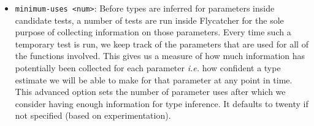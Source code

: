 \begin{itemize}
   \item \texttt{\textendash \textendash minimum-uses <num>}: Before types are inferred for parameters inside candidate tests, a number of tests are run inside \textsf{Flycatcher} for the sole purpose of collecting information on those parameters. Every time such a temporary test is run, we keep track of the parameters that are used for all of the functions involved. This gives us a measure of how much information has potentially been collected for each parameter \emph{i.e.} how confident a type estimate we will be able to make for that parameter at any point in time. This advanced option sets the number of parameter uses after which we consider having enough information for type inference. It defaults to twenty if not specified (based on experimentation).
\end{itemize}



